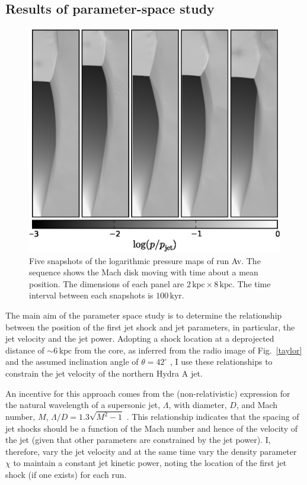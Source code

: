 \subsection{Results of parameter-space study}
\begin{figure}
\includegraphics[width=\linewidth]{pml.eps}
\caption{Five snapshots of the logarithmic pressure maps of run Av. The sequence shows the Mach disk moving with time about a mean position. The dimensions of each panel are $2\,\mathrm{kpc}\times8\,\mathrm{kpc}$. The time interval between each snapshots is $100\,\mathrm{kyr}$.}
\label{pressure_evolution}
\end{figure}

The main aim of the parameter space study is to determine the relationship between the position of the first jet shock and jet parameters, in particular, the jet velocity and the jet power. Adopting a shock location at a deprojected distance of $\sim6\,\mathrm{kpc}$ from the core, as inferred from the radio image of Fig.~\ref{taylor} and the assumed inclination angle of
$\theta=42^\circ$ \citep{taylor90}, I use these relationships to constrain the jet velocity of the northern Hydra A jet.

An incentive for this approach comes from the (non-relativistic) expression for the natural wavelength of a supersonic jet, $\Lambda$, with diameter, $D$, and Mach number, $M$, $\Lambda/D = 1.3\sqrt{M^2 - 1}$ \citep{birkhoff57a}.
This relationship indicates that the spacing of jet shocks should be a function of the Mach number and hence of the velocity of the jet (given that other parameters are constrained by the jet power). I, therefore, vary the jet velocity and at the same time vary the density parameter $\chi$ to maintain a constant jet kinetic power, noting the location of the first jet shock (if one exists) for each run.

